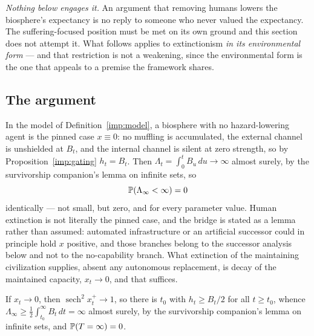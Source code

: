 \emph{Nothing below engages it.} An argument that removing humans lowers
the biosphere's expectancy is no reply to someone who never valued the
expectancy. The suffering-focused position must be met on its own ground
and this section does not attempt it. What follows applies to
extinctionism \emph{in its environmental form} --- and that restriction
is not a weakening, since the environmental form is the one that appeals
to a premise the framework shares.

\subsection{The argument}\label{hr:subsub:extinctionargument}

\begin{proposition}\label{hr:prop:extinction}
In the model of Definition~\ref{imp:model}, a biosphere with no hazard-lowering
agent is the pinned case $x\equiv0$: no muffling is accumulated, the
external channel is unshielded at $B_t$, and the internal channel is
silent at zero strength, so by Proposition~\ref{imp:gating}
$h_t=B_t$. Then $\Lambda_t=\int_0^tB_u\,du\to\infty$ almost surely, by the
survivorship companion's lemma on infinite sets, so
\[
\mathbb{P}(\Lambda_\infty<\infty)=0
\]
identically --- not small, but zero, and for every parameter value.
Human extinction is not literally the pinned case, and the bridge is
stated as a lemma rather than assumed: automated infrastructure or an
artificial successor could in principle hold $x$ positive, and those
branches belong to the successor analysis below and not to the
no-capability branch. What extinction of the maintaining civilization
supplies, absent any autonomous replacement, is decay of the maintained
capacity, $x_t\to0$, and that suffices.

\begin{lemma}
\label{hr:lem:decay}
If $x_t\to0$, then $\operatorname{sech}^2x_t^+\to1$, so there is $t_0$
with $h_t\ge B_t/2$ for all $t\ge t_0$, whence
$\Lambda_\infty\ge\tfrac12\int_{t_0}^\infty B_t\,dt=\infty$ almost surely, by
the survivorship companion's lemma on infinite sets, and $\mathbb{P}(T=\infty)=0$.
\end{lemma}


\end{proposition}
